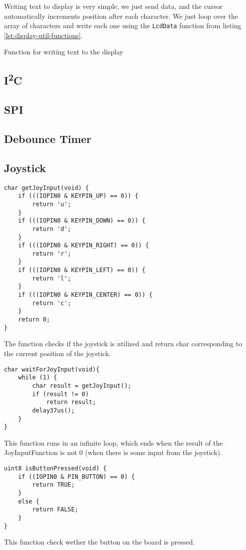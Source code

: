 \documentclass[10pt]{article}
\newcommand{\code}[3]{}
\begin{document}
    Writing text to display is very simple, we just send data, and the cursor automatically increments position after each character.
    We just loop over the array of characters and write each one using the \texttt{LcdData} function from listing \ref{lst:display-util-functions}.

    \begin{program}[H]
        \code{118}{124}{display.h}
        \caption{Function for writing text to the display}
    \end{program}

    \subsection{I\textsuperscript{2}C}

    \subsection{SPI}

    \subsection{Debounce Timer}
    
    \subsection{Joystick}
    	\begin{lstlisting}[caption = {Joystick get input function}]
char getJoyInput(void) {
    if (((IOPIN0 & KEYPIN_UP) == 0)) {
		return 'u';
	}
	if (((IOPIN0 & KEYPIN_DOWN) == 0)) {
		return 'd';
	}
	if (((IOPIN0 & KEYPIN_RIGHT) == 0)) {
		return 'r';
	}
	if (((IOPIN0 & KEYPIN_LEFT) == 0)) {
		return 'l';
	}
	if (((IOPIN0 & KEYPIN_CENTER) == 0)) {
		return 'c';
	}
    return 0;
}
	\end{lstlisting}
	The function checks if the joystick is utilized and return char corresponding to the current position of the joystick.

	\begin{lstlisting}[caption = {Await joystick input function}]
char waitForJoyInput(void){
	while (1) {
		char result = getJoyInput();
		if (result != 0)
			return result;
		delay37us();
	}
}
	\end{lstlisting}
This function runs in an infinite loop, which ends when the result of the JoyInputFunction is not 0 (when there is some input from the joystick).

	\begin{lstlisting}[caption = {Get button input function}]
uint8 isButtonPressed(void) {
	if ((IOPIN0 & PIN_BUTTON) == 0) {
		return TRUE;
	}
	else {
		return FALSE;
	}
}
	\end{lstlisting}
This function check wether the button on the board is pressed.
\end{document}
